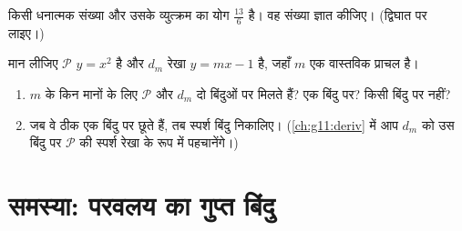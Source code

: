 \begin{exercise}[$\star\star$]\label{exo:g11:quad:10}
किसी धनात्मक संख्या और उसके व्युत्क्रम का योग $\frac{13}{6}$ है। वह संख्या ज्ञात
कीजिए। (द्विघात  पर लाइए।)
\end{exercise}

\begin{exercise}[$\star\star\star$]\label{exo:g11:quad:11}
मान लीजिए $\mathcal P$  $y = x^2$ है और $d_m$ रेखा $y = mx - 1$ है, जहाँ $m$ एक
वास्तविक प्राचल है।
\begin{enumerate}
  \item $m$ के किन मानों के लिए $\mathcal P$ और $d_m$ दो बिंदुओं पर मिलते हैं?
        एक बिंदु पर? किसी बिंदु पर नहीं?
  \item जब वे ठीक एक बिंदु पर छूते हैं, तब स्पर्श बिंदु निकालिए। (\cref{ch:g11:deriv} में
        आप $d_m$ को उस बिंदु पर $\mathcal P$ की स्पर्श रेखा के रूप में पहचानेंगे।)
\end{enumerate}
\end{exercise}

\section{समस्या: परवलय का गुप्त बिंदु}


